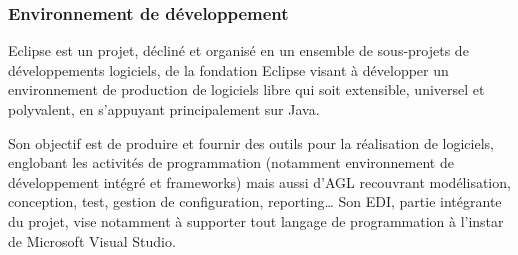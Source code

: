 \documentclass[a4paper]{report}
\begin{document}
\begin{spacing}{2}
\subsubsection{Environnement de  développement}
\begin{minipage}{0.2\textwidth}
	\begin{minipage}{\linewidth}
	\end{minipage}
\end{minipage}
\hfill
\begin{minipage}{0.75\textwidth}
	Eclipse est un projet, décliné et organisé en un ensemble de sous-projets de développements logiciels, de la fondation Eclipse visant à développer un environnement de production de logiciels libre qui soit extensible, universel et polyvalent, en s'appuyant principalement sur Java.

    Son objectif est de produire et fournir des outils pour la réalisation de logiciels, englobant les activités de programmation (notamment environnement de développement intégré et frameworks) mais aussi d'AGL recouvrant modélisation, conception, test, gestion de configuration, reporting… Son EDI, partie intégrante du projet, vise notamment à supporter tout langage de programmation à l'instar de Microsoft Visual Studio.
\end{minipage}\\

\end{spacing}
\end{document}
